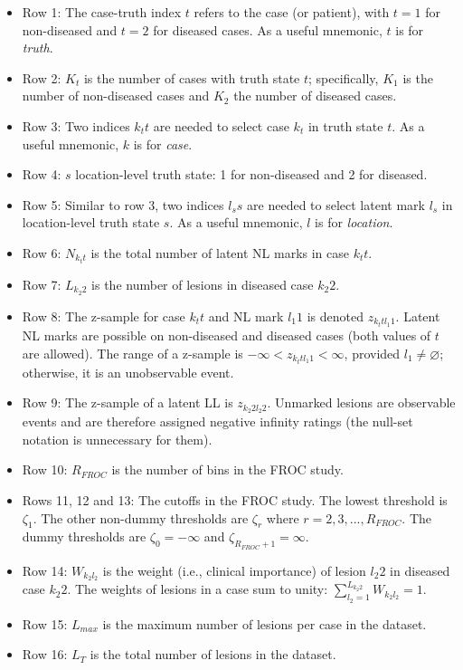\documentclass[
]{book}
\begin{document}
\begin{itemize}
\item
  Row 1: The case-truth index \(t\) refers to the case (or patient), with \(t = 1\) for non-diseased and \(t = 2\) for diseased cases. As a useful mnemonic, \(t\) is for \emph{truth}.
\item
  Row 2: \(K_t\) is the number of cases with truth state \(t\); specifically, \(K_1\) is the number of non-diseased cases and \(K_2\) the number of diseased cases.
\item
  Row 3: Two indices \(k_t t\) are needed to select case \(k_t\) in truth state \(t\). As a useful mnemonic, \(k\) is for \emph{case}.
\item
  Row 4: \(s\) location-level truth state: 1 for non-diseased and 2 for diseased.
\item
  Row 5: Similar to row 3, two indices \(l_s s\) are needed to select latent mark \(l_s\) in location-level truth state \(s\). As a useful mnemonic, \(l\) is for \emph{location}.
\item
  Row 6: \(N_{k_t t}\) is the total number of latent NL marks in case \(k_t t\).
\item
  Row 7: \(L_{k_2 2}\) is the number of lesions in diseased case \(k_2 2\).
\item
  Row 8: The z-sample for case \(k_t t\) and NL mark \(l_1 1\) is denoted \(z_{k_t t l_1 1}\). Latent NL marks are possible on non-diseased and diseased cases (both values of \(t\) are allowed). The range of a z-sample is \(-\infty < z_{k_t t l_1 1} < \infty\), provided \(l_1 \neq \varnothing\); otherwise, it is an unobservable event.
\item
  Row 9: The z-sample of a latent LL is \(z_{k_2 2 l_2 2}\). Unmarked lesions are observable events and are therefore assigned negative infinity ratings (the null-set notation is unnecessary for them).
\item
  Row 10: \(R_{FROC}\) is the number of bins in the FROC study.
\item
  Rows 11, 12 and 13: The cutoffs in the FROC study. The lowest threshold is \(\zeta_1\). The other non-dummy thresholds are \(\zeta_r\) where \(r=2,3,...,R_{FROC}\). The dummy thresholds are \(\zeta_0 = -\infty\) and \(\zeta_{R_{FROC}+1} = \infty\).
\item
  Row 14: \(W_{k_2 l_2}\) is the weight (i.e., clinical importance) of lesion \(l_2 2\) in diseased case \(k_2 2\). The weights of lesions in a case sum to unity: \(\sum_{l_2 = 1}^{L_{k_2 2}}W_{k_2 l_2} = 1\).
\item
  Row 15: \(L_{max}\) is the maximum number of lesions per case in the dataset.
\item
  Row 16: \(L_T\) is the total number of lesions in the dataset.
\end{itemize}
\end{document}
